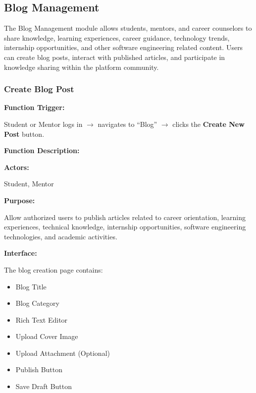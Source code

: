 \subsection{Blog Management}

The Blog Management module allows students, mentors, and career counselors to share knowledge, learning experiences, career guidance, technology trends, internship opportunities, and other software engineering related content. Users can create blog posts, interact with published articles, and participate in knowledge sharing within the platform community.

\subsubsection{Create Blog Post}

\textbf{Function Trigger:}

Student or Mentor logs in $\rightarrow$ navigates to ``Blog'' $\rightarrow$ clicks the \textbf{Create New Post} button.

\vspace{0.3cm}

\textbf{Function Description:}

\textbf{Actors:}

Student, Mentor

\vspace{0.2cm}

\textbf{Purpose:}

Allow authorized users to publish articles related to career orientation, learning experiences, technical knowledge, internship opportunities, software engineering technologies, and academic activities.

\vspace{0.2cm}

\textbf{Interface:}

The blog creation page contains:

\begin{itemize}
    \item Blog Title
    \item Blog Category
    \item Rich Text Editor
    \item Upload Cover Image
    \item Upload Attachment (Optional)
    \item Publish Button
    \item Save Draft Button
\end{itemize}

